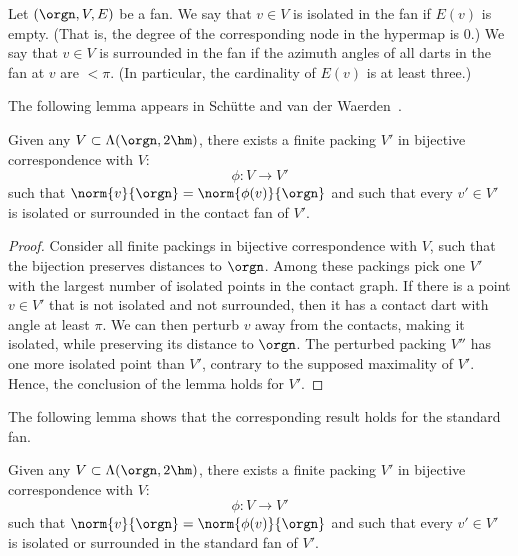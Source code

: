 \begin{definition}
Let $(\orgn,V,E)$ be a fan.
We say that $v\in V$ is isolated in the fan if $E(v)$ is empty.
(That is, the degree of the corresponding node in the hypermap is $0$.) We say that $v\in V$ is surrounded in the fan if the azimuth angles of all darts in the fan at $v$ are $<\pi$.  (In particular, the cardinality of $E(v)$ is at least three.)
\end{definition}

The following lemma appears in Sch\"utte and van der Waerden~\cite{vanderWaerden:1951}.

\begin{lemma}
Given any $V\subset \Lambda(\orgn,2\hm)$,
there exists a finite packing $V'$ 
in bijective correspondence with $V$:
$$
\phi:V\to V'
$$
such that $\norm{v}{\orgn} = \norm{\phi(v)}{\orgn}$ and
such that every $v'\in V'$
is isolated or surrounded in the contact fan of $V'$.
\end{lemma}

\begin{proof} Consider all finite packings in 
bijective correspondence with $V$, such that the
bijection preserves distances to $\orgn$.
Among these packings pick one $V'$ with the largest number
of isolated points in the contact graph.  If there is a point $v\in V'$ that
is not isolated and not surrounded, then it has a contact
dart with angle at least $\pi$.  We can then perturb $v$ away from the contacts, making it isolated, while preserving its distance to $\orgn$.  The perturbed packing $V''$ has one more isolated point than $V'$, contrary to the supposed maximality of $V'$.  Hence, the conclusion of the 
lemma holds for $V'$.
\end{proof}

The following lemma shows that the corresponding result
holds for the standard fan.

\begin{lemma}\label{lemma:surrounded}  
Given any $V\subset \Lambda(\orgn,2\hm)$,
there exists a finite packing $V'$ 
in bijective correspondence with $V$:
$$
\phi:V\to V'
$$
such that $\norm{v}{\orgn} = \norm{\phi(v)}{\orgn}$ and
such that every $v'\in V'$
is isolated or surrounded in the standard fan of $V'$.
\end{lemma}

